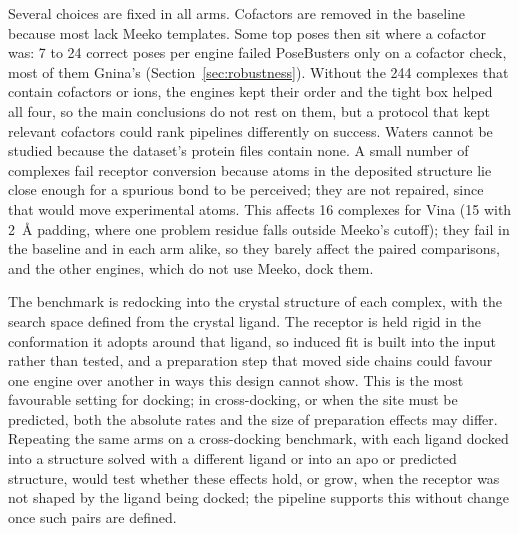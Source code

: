 Several choices are fixed in all arms. Cofactors are removed in the baseline because most
lack Meeko templates. Some top poses then sit where a cofactor was: 7 to 24 correct poses
per engine failed PoseBusters only on a cofactor check, most of them Gnina's
(Section~\ref{sec:robustness}). Without the 244 complexes that contain cofactors or ions, the
engines kept their order and the tight box helped all four, so the main conclusions do not
rest on them, but a protocol that kept relevant cofactors could rank pipelines differently on
\pbvalid{} success. Waters cannot be studied because the dataset's protein
files contain none. A small number of complexes fail receptor conversion because atoms in
the deposited structure lie close enough for a spurious bond to be perceived; they are not
repaired, since that would move experimental atoms. This affects 16 complexes for Vina
(15 with \SI{2}{\angstrom} padding, where one problem residue falls outside Meeko's
cutoff); they fail in the baseline and in each arm alike, so they barely affect the paired
comparisons, and the other engines, which do not use Meeko, dock them.

The benchmark is redocking into the crystal structure of each complex, with the search
space defined from the crystal ligand. The receptor is held rigid in the conformation it
adopts around that ligand, so induced fit is built into the input rather than tested, and
a preparation step that moved side chains could favour one engine over another in ways
this design cannot show. This is the most favourable setting for docking; in
cross-docking, or when the site must be predicted, both the absolute rates and the size of
preparation effects may differ. Repeating the same arms on a cross-docking benchmark, with
each ligand docked into a structure solved with a different ligand or into an apo or
predicted structure, would test whether these effects hold, or grow, when the receptor was
not shaped by the ligand being docked; the pipeline supports this without change once such
pairs are defined.


